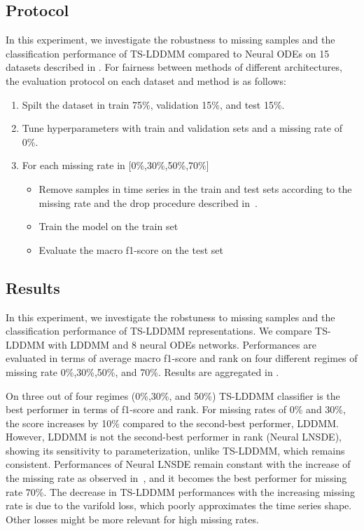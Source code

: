 \subsection{Protocol}

In this experiment, we investigate the robustness to missing samples and the classification performance of TS-LDDMM compared to Neural ODEs on 15 datasets described in . For fairness between methods of different architectures, the evaluation protocol on each dataset and method is as follows: 
\begin{enumerate}
  \item Spilt the dataset in train 75\%, validation 15\%, and test 15\%.
  \item Tune hyperparameters with train and validation sets and a missing rate of 0\%.
  \item For each missing rate in [0\%,30\%,50\%,70\%]
    \begin{itemize}
      \item Remove samples in time series in the train and test sets according to the missing rate and the drop procedure described in~\cite{kidger2020neural}.
      \item Train the model on the train set
      \item Evaluate the macro f1-score on the test set
    \end{itemize}
\end{enumerate}




\subsection{Results}
In this experiment, we investigate the robstuness to missing samples and the classification performance of TS-LDDMM representations. We compare TS-LDDMM with LDDMM and 8 neural ODEs networks. Performances are evaluated in terms of average macro f1-score and rank on four different regimes of missing rate 0\%,30\%,50\%, and 70\%. Results are aggregated in . 

On three out of four regimes (0\%,30\%, and 50\%) TS-LDDMM classifier is the best performer in terms of f1-score and rank. For missing rates of 0\% and 30\%, the score increases by 10\% compared to the second-best performer, LDDMM. However, LDDMM is not the second-best performer in rank (Neural LNSDE), showing its sensitivity to parameterization, unlike TS-LDDMM, which remains consistent. Performances of Neural LNSDE remain constant with the increase of the missing rate as observed in~\cite{oh2024stable}, and it becomes the best performer for missing rate 70\%. The decrease in TS-LDDMM performances with the increasing missing rate is due to the varifold loss, which poorly approximates the time series shape. Other losses might be more relevant for high missing rates.

